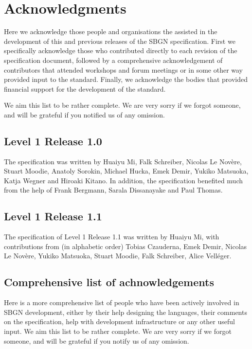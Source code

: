 \chapter{Acknowledgments}\label{sec:acknowledgments}

Here we acknowledge those people and organisations the assisted in the development of this and previous releases of the SBGN \AFl specification. First we specifically acknowledge those who contributed directly to each revision of the  specification document, followed by a comprehensive acknowledgement of contributors that attended workshops and forum meetings or in some other way provided input to the standard. Finally, we acknowledge the bodies that provided financial support for the development of the standard.


 We aim this list to be rather complete. We are very sorry if we forgot someone, and will be grateful if you notified us of any omission.

\section{Level 1 Release 1.0}

The specification was written by Huaiyu Mi, Falk Schreiber, Nicolas Le Nov\`{e}re, Stuart Moodie, Anatoly Sorokin, Michael Hucka, Emek Demir, Yukiko Matsuoka, Katja Wegner and Hiroaki Kitano. In addition, the specification benefited much from the help of Frank Bergmann, Sarala Dissanayake and Paul Thomas.

\section{Level 1 Release 1.1}
The specification of \AF Level 1 Release 1.1 was written by Huaiyu Mi, with contributions from (in alphabetic order) Tobias Czauderna, Emek Demir, Nicolas Le Nov\`{e}re, Yukiko Matsuoka, Stuart Moodie, Falk Schreiber, Alice Vell\'{e}ger.

\section{Comprehensive list of achnowledgements}

Here is a more comprehensive list of people who have been actively involved in SBGN development, either by their help designing the languages, their comments on the specification, help with development infrastructure or any other useful input.  We aim this list to be rather complete. We are very sorry if we forgot someone, and will be grateful if you notify us of any omission.

